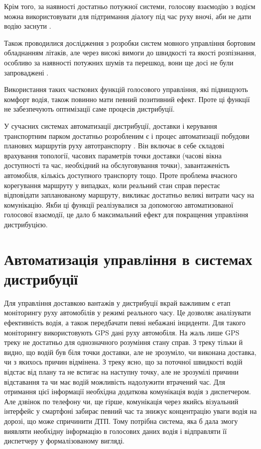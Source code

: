 Крім того, за наявності достатньо потужної системи, голосову взаємодію з водієм можна використовувати для підтримання діалогу під час руху вночі, аби не дати водію заснути \cite{Kravchenko_2012}.

Також проводилися дослідження з розробки систем мовного управління бортовим обладнанням літаків, але через високі вимоги до швидкості та якості розпізнання, особливо за наявності потужних шумів та перешкод, вони ще досі не були запроваджені \cite{Korsun_2013}.

Використання таких часткових функцій голосового управління, які підвищують комфорт водія, також повинно мати певний позитивний ефект. Проте ці функції не забезпечують оптимізації саме процесів дистрибуції.

У сучасних системах автоматизації дистрибуції, доставки і керування транспортним парком достатньо розробленим є і процес автоматизації побудови планових маршрутів руху автотранспорту \cite{art1}. Він включає в себе складові врахування топології, часових параметрів точки доставки (часові вікна доступності та час, необхідний на обслуговування точки), завантаженість автомобіля, кількісь доступного транспорту тощо. Проте проблема вчасного корегування маршруту у випадках, коли реальний стан справ перестає відповідати запланованому маршруту, викликає достатньо великі витрати часу на комунікацію. Якби ці функції реалізувалися за допомогою автоматизованої голосової взаємодії, це дало б максимальний ефект для покращення управління дистрибуцією.

\section{Автоматизація управління в системах дистрибуції} \label{sect1_3}

Для управління доставкою вантажів у дистрибуції вкрай важливим є етап моніторингу руху автомобілів у режимі реального часу. Це дозволяє аналізувати ефективність водія, а також передбачати певні небажані інциденти. Для такого моніторингу використовують GPS дані руху автомобіля\cite{Gonzalez_2013,Comendador_2012}. На жаль лише GPS треку не достатньо для однозначного розуміння стану справ. З треку тільки й видно, що водій був біля точки доставки, але не зрозуміло, чи виконана доставка, чи з якихось причин відмінена. З треку ясно, що за поточної швидкості водій відстає від плану та не встигає на наступну точку, але не зрозумілі причини відставання та чи має водій можливість надолужити втрачений час. Для отримання цієї інформації необхідна додаткова комунікація водія з диспетчером. Але дзвінок по телефону чи, ще гірше, комунікація через якийсь візуальний інтерфейс у смартфоні забирає певний час та знижує концентрацію уваги водія на дорозі, що може спричинити ДТП. Тому потрібна система, яка б дала змогу виявляти необхідну інформацію в голосових даних водія і відправляти її диспетчеру у формалізованому вигляді.

